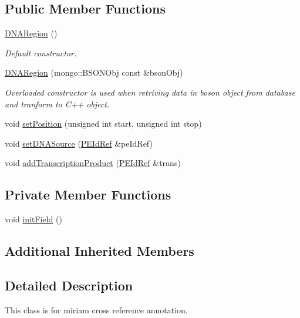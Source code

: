 \subsection*{Public Member Functions}
\begin{DoxyCompactItemize}
\item 
\hyperlink{classunisys_1_1DNARegion_af142125cfb0ab547f47e00bd96a66c0b}{D\-N\-A\-Region} ()
\begin{DoxyCompactList}\small\item\em Default constructor. \end{DoxyCompactList}\item 
\hyperlink{classunisys_1_1DNARegion_a9fe4a81c75d6af75126e4962c0adb40a}{D\-N\-A\-Region} (mongo\-::\-B\-S\-O\-N\-Obj const \&bson\-Obj)
\begin{DoxyCompactList}\small\item\em Overloaded constructor is used when retriving data in boson object from database and tranform to C++ object. \end{DoxyCompactList}\item 
void \hyperlink{classunisys_1_1DNARegion_a50fb9c5129cbcf18d0603dc177ca7fd1}{set\-Position} (unsigned int start, unsigned int stop)
\item 
void \hyperlink{classunisys_1_1DNARegion_ac66d69ad5a779ba72bdf54e099085948}{set\-D\-N\-A\-Source} (\hyperlink{classunisys_1_1PEIdRef}{P\-E\-Id\-Ref} \&pe\-Id\-Ref)
\item 
void \hyperlink{classunisys_1_1DNARegion_a33a75b0bcde3731bfbc76770a564ed06}{add\-Transcription\-Product} (\hyperlink{classunisys_1_1PEIdRef}{P\-E\-Id\-Ref} \&trans)
\end{DoxyCompactItemize}
\subsection*{Private Member Functions}
\begin{DoxyCompactItemize}
\item 
void \hyperlink{classunisys_1_1DNARegion_a213d2340cc8f4172e3f220f1fe9883f1}{init\-Field} ()
\end{DoxyCompactItemize}
\subsection*{Additional Inherited Members}


\subsection{Detailed Description}
This class is for miriam cross reference annotation. 

